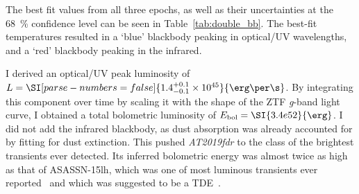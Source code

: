 The best fit values from all three epochs, as well as their uncertainties at the \SI{68}{\percent} confidence level can be seen in Table~\ref{tab:double_bb}. The best-fit temperatures resulted in a `blue' blackbody peaking in optical/UV wavelengths, and a `red' blackbody peaking in the infrared.

I derived an optical/UV peak luminosity of $L=\SI[parse-numbers = false]{1.4^{+0.1}_{-0.1}\times10^{45}}{\erg\per\s}$. By integrating this component over time by scaling it with the shape of the ZTF \textit{g}-band light curve, I obtained a total bolometric luminosity of $E_\text{bol} = \SI{3.4e52}{\erg}$. I did not add the infrared blackbody, as dust absorption was already accounted for by fitting for dust extinction. This pushed \emph{AT2019fdr} to the class of the brightest transients ever detected. Its inferred bolometric energy was almost twice as high as that of ASASSN-15lh, which was one of most luminous transients ever reported~ and which was suggested to be a TDE~.

